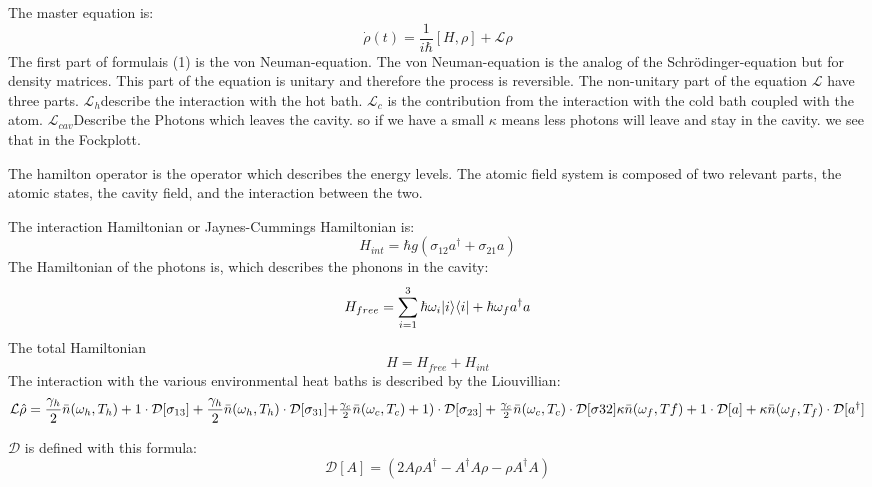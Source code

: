 \documentclass[12pt,a4paper]{article}
\DeclarePairedDelimiter\bra{\langle}{\rvert}
\DeclarePairedDelimiter\ket{\lvert}{\rangle}
\begin{document}
\newpage
The master equation is:
\begin{equation}
\dot{\rho}(t)=\frac{1}{i \hbar}[H,\rho]+ \mathcal{L}\rho
\end{equation}
The first part of formulais (1) is the von Neuman-equation. The von Neuman-equation is the analog of the Schrödinger-equation but for density matrices. This part of the equation is unitary and therefore the process is reversible.
The non-unitary part of the equation 
$\mathcal{L}$ have three parts. $\mathcal{L}_h$describe the interaction with the hot bath.
$\mathcal{L}_c$ is the contribution from the interaction with the cold bath coupled with the atom.
$\mathcal{L}_{cav}$Describe the Photons which leaves the cavity. so if we have a small $\kappa$ means less photons will leave and stay in the cavity. we see that in the Fockplott.

The hamilton operator is the operator which describes the energy levels. 
The atomic field system is composed of two relevant
parts, the atomic states, the cavity field, and the interaction between the two.

The interaction Hamiltonian or Jaynes-Cummings Hamiltonian is:
\begin{equation}
H_{int}=\hbar g(\sigma_{12}a^{\dag}+\sigma_{21}a)
\end{equation}
The  Hamiltonian of the photons is, which describes the phonons in the cavity:
\begin{equation}
H_{free}=\sum_{i=1}^3 \hbar \omega_i \ket{i}\bra{i}+\hbar \omega_f a^{\dag}a
\end{equation}
The total Hamiltonian
\begin{equation}
H=H_{free}+H_{int}
\end{equation}
\newpage
The interaction with the various environmental heat baths is described by the Liouvillian:
\begin{equation}
\mathcal{L}\hat{\rho}=\frac{\gamma_h}{2}\bar{n}(\omega_h,T_h)+1   \cdot \mathcal{D}[\sigma_{13}]
+\frac{\gamma_h}{2}\bar{n}(\omega_h,T_h)\cdot \mathcal{D}[\sigma_{31}]$$\\$$
+\frac{\gamma_c}{2}\bar{n}(\omega_c,T_c)+1)\cdot \mathcal{D}[\sigma_{23}]
+\frac{\gamma_c}{2}\bar{n}(\omega_c,T_c) \cdot	 \mathcal{D}[\sigma{32}]$$\\$$
\kappa\bar{n}(\omega_f,Tf)+1	\cdot\mathcal{D}[a]+
\kappa \bar{n}(\omega_f,T_f)\cdot \mathcal{D}[a^{\dag}]
\end{equation}

$\mathcal{D}$ is defined with this formula:
\begin{equation}
\mathcal{D}[A]=(2A \rho	A^{\dag}-A^{\dag}A\rho-\rho A^{\dag}A)
\end{equation}
\end{document}

